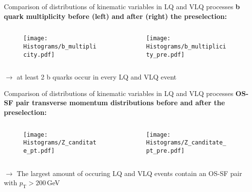 \documentclass[aspectratio=1610, professionalfonts, 9pt]{beamer}
\begin{document}
\begin{frame}{Comparison of distributions of kinematic variables in LQ and VLQ processes}
    \textbf{b quark multiplicity before (left) and after (right) the preselection:}\\
    \begin{columns}
        \begin{column}{0.5\textwidth}
            \begin{figure}
                \centering
                \texttt{[image: Histograms/b\_multiplicity.pdf]}
                \label{fig:b_mult}
            \end{figure}
        \end{column}
        \begin{column}{0.5\textwidth}
            \begin{figure}
                \centering
                \texttt{[image: Histograms/b\_multiplicity\_pre.pdf]}
                \label{fig:b_mult_pre}
            \end{figure}
        \end{column}
    \end{columns}
    \(\rightarrow\) at least 2 b quarks occur in every LQ and VLQ event
\end{frame}

\begin{frame}{Comparison of distributions of kinematic variables in LQ and VLQ processes}
    \textbf{OS-SF pair transverse momentum distributions before and after the preselection:}
    \begin{columns}
        \begin{column}{0.5\textwidth}
            \begin{figure}
                \centering
                \texttt{[image: Histograms/Z\_canditate\_pt.pdf]}
                \label{fig:ll_pt}
            \end{figure}
        \end{column}
        \begin{column}{0.5\textwidth}
            \begin{figure}
                \centering
                \texttt{[image: Histograms/Z\_canditate\_pt\_pre.pdf]}
                \label{fig:ll_pt_pre}
            \end{figure}
        \end{column}
    \end{columns}
    \(\rightarrow\) The largest amount of occuring LQ and VLQ events contain an OS-SF pair with \(p_{\mathrm{T}} > 200\,\)GeV
\end{frame}
\end{document}
